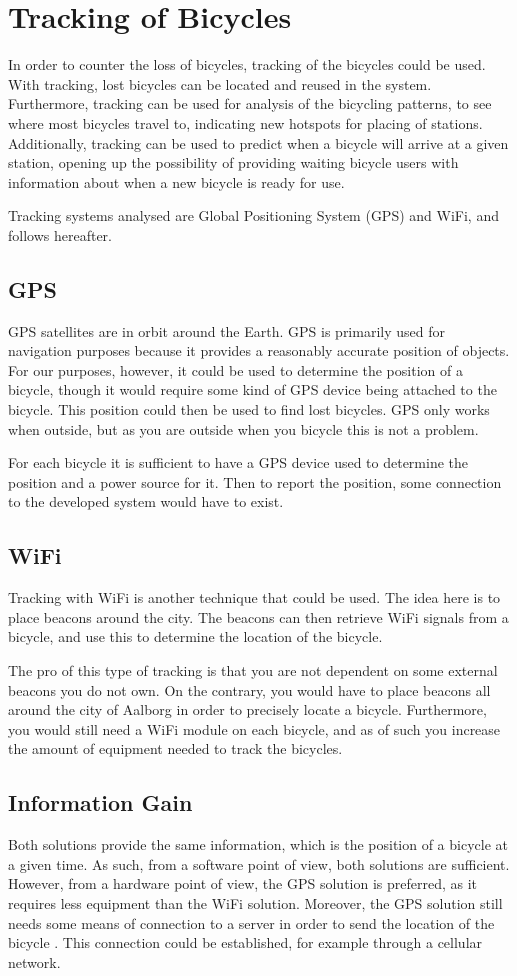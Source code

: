 \section{Tracking of Bicycles}
In order to counter the loss of bicycles, tracking of the bicycles could be used.
With tracking, lost bicycles can be located and reused in the system.
Furthermore, tracking can be used for analysis of the bicycling patterns, to see where most bicycles travel to, indicating new hotspots for placing of stations.
Additionally, tracking can be used to predict when a bicycle will arrive at a given station, opening up the possibility of providing waiting bicycle users with information about when a new bicycle is ready for use.

Tracking systems analysed are Global Positioning System (GPS) and WiFi, and follows hereafter.
\subsection{GPS}
GPS satellites are in orbit around the Earth.
GPS is primarily used for navigation purposes because it provides a reasonably accurate position of objects.
For our purposes, however, it could be used to determine the position of a bicycle, though it would require some kind of GPS device being attached to the bicycle.
This position could then be used to find lost bicycles.
GPS only works when outside, but as you are outside when you bicycle this is not a problem.

For each bicycle it is sufficient to have a GPS device used to determine the position and a power source for it.
Then to report the position, some connection to the developed system would have to exist.

\subsection{WiFi}
Tracking with WiFi is another technique that could be used.
The idea here is to place beacons around the city.
The beacons can then retrieve WiFi signals from a bicycle, and use this to determine the location of the bicycle.

The pro of this type of tracking is that you are not dependent on some external beacons you do not own.
On the contrary, you would have to place beacons all around the city of Aalborg in order to precisely locate a bicycle.
Furthermore, you would still need a WiFi module on each bicycle, and as of such you increase the amount of equipment needed to track the bicycles.

\subsection{Information Gain}
Both solutions provide the same information, which is the position of a bicycle at a given time.
As such, from a software point of view, both solutions are sufficient.
However, from a hardware point of view, the GPS solution is preferred, as it requires less equipment than the WiFi solution. 
Moreover, the GPS solution still needs some means of connection to a server in order to send the location of the bicycle \citep{misc:gpsSystem}. 
This connection could be established, for example through a cellular network.